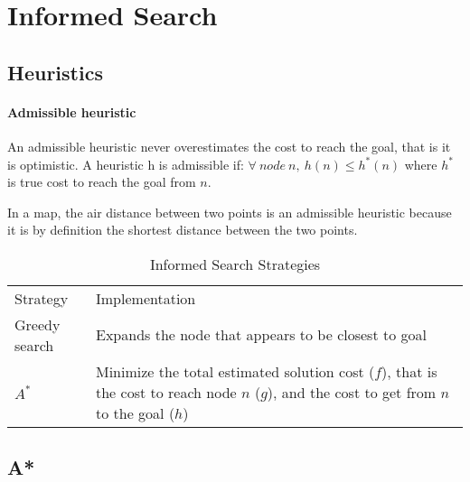 \section{Informed Search}

\subsection{Heuristics}

\paragraph{Admissible heuristic} An admissible heuristic never
overestimates the cost to reach the goal, that is it is
optimistic. A heuristic h is admissible if:
\begin{math}
  \forall\medspace node \medspace n, \medspace h(n) \leq h^*(n)
\end{math}
where $h^*$ is true cost to reach the goal from $n$.

In a map, the air distance between two points is an admissible
heuristic because it is by definition the shortest distance
between the two points.

\begin{table}[hb!]
\begin{tabular}{ll}
  Strategy & Implementation \\
  Greedy search &
  \multicolumn{1}{p{0.65\linewidth}}{
    Expands the node that appears to be closest to goal
  } \\
  $A^*$ &
  \multicolumn{1}{p{0.65\linewidth}}{
    Minimize the total estimated solution cost ($f$), that is
    the cost to reach node $n$ ($g$), and the cost to
    get from $n$ to the goal ($h$)
  }
\end{tabular}
\caption{Informed Search Strategies}
\label{tab:informed_search_strategies}
\end{table}

\subsection{A*}

